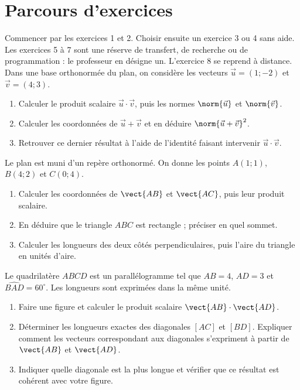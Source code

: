 \section*{Parcours d’exercices}\label{C03-PARC}
Commencer par les exercices 1 et 2. Choisir ensuite un exercice 3 ou 4 sans aide. Les exercices 5 à 7 sont une réserve de transfert, de recherche ou de programmation : le professeur en désigne un. L’exercice 8 se reprend à distance.
\begingroup
{}
Dans une base orthonormée du plan, on considère les vecteurs $\vec u=(1;-2)$ et $\vec v=(4;3)$.
\begin{enumerate}[label=\arabic*.]
\item Calculer le produit scalaire $\vec u\cdot\vec v$, puis les normes $\norm{\vec u}$ et $\norm{\vec v}$.
\item Calculer les coordonnées de $\vec u+\vec v$ et en déduire $\norm{\vec u+\vec v}^2$.
\item Retrouver ce dernier résultat à l’aide de l’identité faisant intervenir $\vec u\cdot\vec v$.
\end{enumerate}
Le plan est muni d’un repère orthonormé. On donne les points $A(1;1)$, $B(4;2)$ et $C(0;4)$.
\begin{enumerate}[label=\arabic*.]
\item Calculer les coordonnées de $\vect{AB}$ et $\vect{AC}$, puis leur produit scalaire.
\item En déduire que le triangle $ABC$ est rectangle ; préciser en quel sommet.
\item Calculer les longueurs des deux côtés perpendiculaires, puis l’aire du triangle en unités d’aire.
\end{enumerate}
Le quadrilatère $ABCD$ est un parallélogramme tel que $AB=4$, $AD=3$ et $\widehat{BAD}=60^\circ$. Les longueurs sont exprimées dans la même unité.
\begin{enumerate}[label=\arabic*.]
\item Faire une figure et calculer le produit scalaire $\vect{AB}\cdot\vect{AD}$.
\item Déterminer les longueurs exactes des diagonales $[AC]$ et $[BD]$. Expliquer comment les vecteurs correspondant aux diagonales s’expriment à partir de $\vect{AB}$ et $\vect{AD}$.
\item Indiquer quelle diagonale est la plus longue et vérifier que ce résultat est cohérent avec votre figure.
\end{enumerate}
